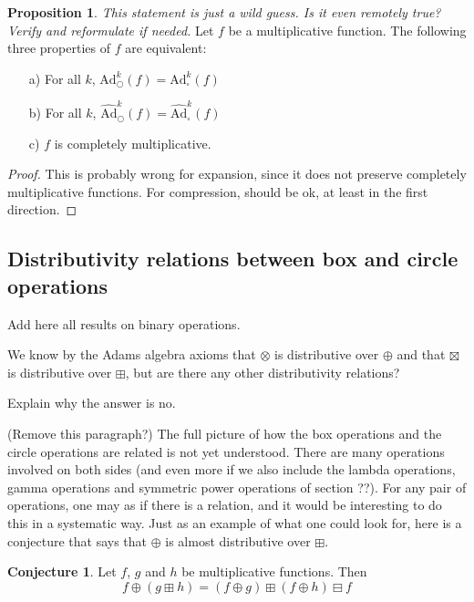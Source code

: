 \documentclass[a4paper]{article}
\theoremstyle{definition}
\newtheorem{conjecture}{Conjecture}[section]
\newtheorem{proposition}[theorem]{Proposition}
\theoremstyle{remark}
\newcommand{\adam}[1]{\text{Ad}^{#1}_{\bigcirc}}
\newcommand{\hatadam}[1]{\widehat{\text{Ad}}^{#1}_{\bigcirc}}
\newcommand{\boxadam}[1]{\text{Ad}^{#1}_{\square}}
\newcommand{\hatboxadam}[1]{\widehat{\text{Ad}}^{#1}_{\square}}
\begin{document}
\begin{proposition}
\emph{This statement is just a wild guess. Is it even remotely true? Verify and reformulate if needed.}
Let $f$ be a multiplicative function. The following three properties of $f$ are equivalent:
\begin{itemize}
\item[a)] For all $k$, $\adam{k}(f) = \boxadam{k}(f)$
\item[b)] For all $k$, $\hatadam{k}(f) = \hatboxadam{k}(f)$
\item[c)] $f$ is completely multiplicative.
\end{itemize}
\end{proposition}
\begin{proof}
This is probably wrong for expansion, since it does not preserve completely multiplicative functions. For compression, should be ok, at least in the first direction.
\end{proof}


\subsection{Distributivity relations between box and circle operations}

Add here all results on binary operations.

We know by the Adams algebra axioms that $\otimes$ is distributive over $\oplus$ and that $\boxtimes$ is distributive over $\boxplus$, but are there any other distributivity relations? 

Explain why the answer is no.

(Remove this paragraph?) The full picture of how the box operations and the circle operations are related is not yet understood. There are many operations involved on both sides (and even more if we also include the lambda operations, gamma operations and symmetric power operations of section ??). For any pair of operations, one may as if there is a relation, and it would be interesting to do this in a systematic way. Just as an example of what one could look for, here is a conjecture that says that $\oplus$ is almost distributive over $\boxplus$.

\begin{conjecture}
Let $f$, $g$ and $h$ be multiplicative functions. Then
$$ f \oplus (g \boxplus h) = (f \oplus g) \boxplus (f \oplus h) \boxminus f     $$
\end{conjecture}
\end{document}
